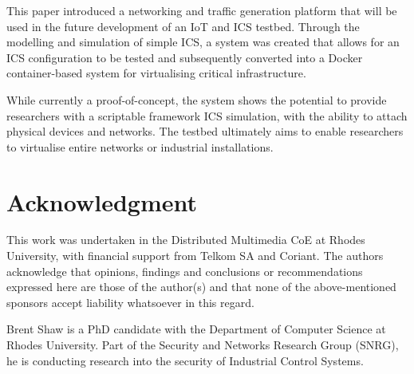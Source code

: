 \documentclass[10pt,conference,a4paper,onecolumn] {IEEEtran}
\begin{document}
\begin{multicols}{2}
This paper introduced a networking and traffic generation platform that will be used in the future development of an IoT and ICS testbed. Through the modelling and simulation of simple ICS, a system was created that allows for an ICS configuration to be tested and subsequently converted into a Docker container-based system for virtualising critical infrastructure.

While currently a proof-of-concept, the system shows the potential to provide researchers with a scriptable framework ICS simulation, with the ability to attach physical devices and networks. The testbed ultimately aims to enable researchers to virtualise entire networks or industrial installations.

\section*{Acknowledgment}
This work was undertaken in the Distributed Multimedia CoE at Rhodes University, with financial support from Telkom SA and Coriant. The authors acknowledge that opinions, findings and conclusions or recommendations expressed here are those of the author(s) and that none of the above-mentioned sponsors accept liability whatsoever in this regard.





\end{multicols}

\vspace{-0.8cm}

\begin{IEEEbiographynophoto}{Brent Shaw}
is a PhD candidate with the Department of Computer Science at Rhodes University. Part of the Security and Networks Research Group (SNRG), he is conducting research into the security of Industrial Control Systems. 
\end{IEEEbiographynophoto}


\vfill
\end{document}
